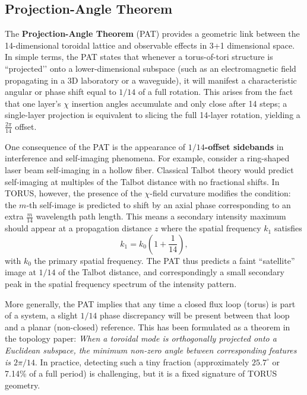 \documentclass[12pt]{article}
\begin{document}
\subsection{Projection-Angle Theorem}
The \textbf{Projection-Angle Theorem} (PAT) provides a geometric link between the 14-dimensional toroidal lattice and observable effects in 3+1 dimensional space. In simple terms, the PAT states that whenever a torus-of-tori structure is “projected’’ onto a lower-dimensional subspace (such as an electromagnetic field propagating in a 3D laboratory or a waveguide), it will manifest a characteristic angular or phase shift equal to $1/14$ of a full rotation. This arises from the fact that one layer’s $\chi$ insertion angles accumulate and only close after 14 steps; a single-layer projection is equivalent to slicing the full 14-layer rotation, yielding a $\frac{2\pi}{14}$ offset.

One consequence of the PAT is the appearance of \textbf{$1/14$-offset sidebands} in interference and self-imaging phenomena. For example, consider a ring-shaped laser beam self-imaging in a hollow fiber. Classical Talbot theory would predict self-imaging at multiples of the Talbot distance with no fractional shifts. In TORUS, however, the presence of the $\chi$-field curvature modifies the condition: the $m$-th self-image is predicted to shift by an axial phase corresponding to an extra $\frac{m}{14}$ wavelength path length. This means a secondary intensity maximum should appear at a propagation distance $z$ where the spatial frequency $k_1$ satisfies 
\[ k_1 = k_0 \left(1 + \frac{1}{14}\right), \] 
with $k_0$ the primary spatial frequency. The PAT thus predicts a faint “satellite” image at $1/14$ of the Talbot distance, and correspondingly a small secondary peak in the spatial frequency spectrum of the intensity pattern.

More generally, the PAT implies that any time a closed flux loop (torus) is part of a system, a slight $1/14$ phase discrepancy will be present between that loop and a planar (non-closed) reference. This has been formulated as a theorem in the topology paper: \emph{When a toroidal mode is orthogonally projected onto a Euclidean subspace, the minimum non-zero angle between corresponding features is $2\pi/14$}. In practice, detecting such a tiny fraction (approximately $25.7^\circ$ or 7.14\% of a full period) is challenging, but it is a fixed signature of TORUS geometry.
\end{document}
